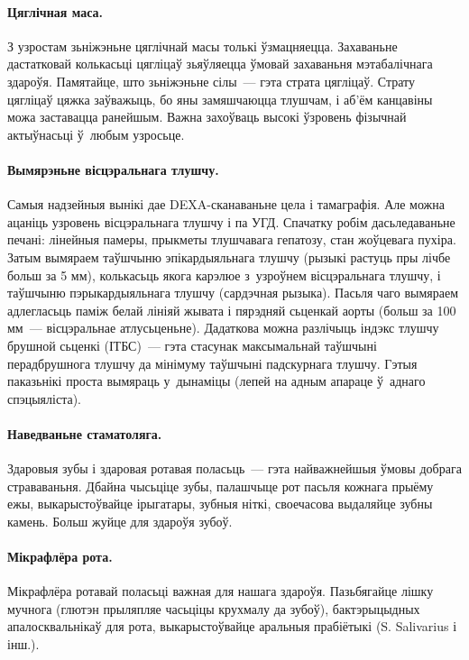 \paragraph{Цяглічная маса.}
З узростам зьніжэньне цяглічнай масы толькі ўзмацняецца. Захаваньне дастатковай колькасьці цягліцаў зьяўляецца ўмовай захаваньня мэтабалічнага здароўя. Памятайце, што зьніжэньне сілы~--- гэта страта цягліцаў. Страту цягліцаў цяжка заўважыць, бо яны замяшчаюцца тлушчам, і аб'ём канцавіны можа заставацца ранейшым. Важна захоўваць высокі ўзровень фізычнай актыўнасьці ў~любым узросьце.

\paragraph{Вымярэньне вісцэральнага тлушчу.}
Самыя надзейныя вынікі дае DEXA-сканаваньне цела і тамаграфія. Але можна ацаніць узровень вісцэральнага тлушчу і па УГД. Спачатку робім дасьледаваньне печані: лінейныя памеры, прыкметы тлушчавага гепатозу, стан жоўцевага пухіра. Затым вымяраем таўшчыню эпікардыяльнага тлушчу (рызыкі растуць пры лічбе больш за 5 мм), колькасьць якога карэлюе з~узроўнем вісцэральнага тлушчу, і таўшчыню пэрыкардыяльнага тлушчу (сардэчная рызыка). Пасьля чаго вымяраем адлегласьць паміж белай лініяй жывата і пярэдняй сьценкай аорты (больш за 100 мм~--- вісцэральнае атлусьценьне). Дадаткова можна разлічыць індэкс тлушчу брушной сьценкі (ІТБС)~--- гэта стасунак максымальнай таўшчыні перадбрушнога тлушчу да мінімуму таўшчыні падскурнага тлушчу. Гэтыя паказьнікі проста вымяраць у~дынаміцы (лепей на адным апараце ў~аднаго спэцыяліста).


\paragraph{Наведваньне стаматоляга.}
Здаровыя зубы і здаровая ротавая поласьць~--- гэта найважнейшыя ўмовы добрага страваваньня. Дбайна чысьціце зубы, палашчыце рот пасьля кожнага прыёму ежы, выкарыстоўвайце ірыгатары, зубныя ніткі, своечасова выдаляйце зубны камень. Больш жуйце для здароўя зубоў.

\paragraph{Мікрафлёра рота.}
Мікрафлёра ротавай поласьці важная для нашага здароўя. Пазьбягайце лішку мучнога (глютэн прыляпляе часьціцы крухмалу да зубоў), бактэрыцыдных апалосквальнікаў для рота, выкарыстоўвайце аральныя прабіётыкі (S. Salivarius і інш.).

